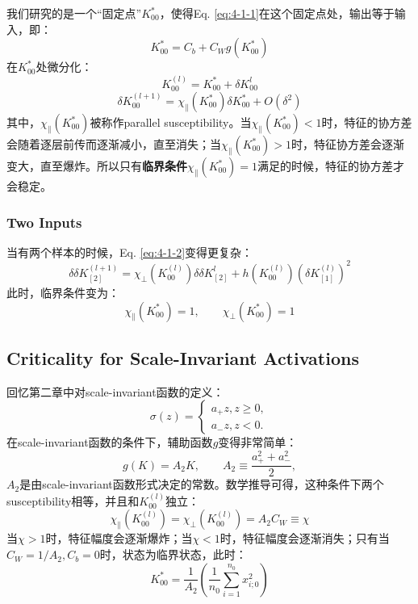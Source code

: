 我们研究的是一个``固定点''$K_{00}^{*}$，使得Eq. \ref{eq:4-1-1}在这个固定点处，输出等于输入，即：
\begin{equation}
    K_{00}^{*} = C_b + C_Wg(K_{00}^{*})
\end{equation}
在$K_{00}^{*}$处微分化：
\begin{equation}
    K_{00}^{(l)} = K_{00}^{*} + \delta K_{00}^{l}
\end{equation}
\begin{equation}
    \delta K_{00}^{(l+1)} = \chi_\parallel(K_{00}^{*})\delta K_{00}^{*} + O(\delta^2)
\label{eq:4-1-2}
\end{equation}
其中，$\chi_\parallel(K_{00}^{*})$被称作parallel susceptibility。当$\chi_\parallel(K_{00}^{*})<1$时，特征的协方差会随着逐层前传而逐渐减小，直至消失；当$\chi_\parallel(K_{00}^{*})>1$时，特征协方差会逐渐变大，直至爆炸。所以只有\textbf{临界条件}$\chi_\parallel(K_{00}^{*})=1$满足的时候，特征的协方差才会稳定。

\subsubsection{Two Inputs}
当有两个样本的时候，Eq. \ref{eq:4-1-2}变得更复杂：
\begin{equation}
    \delta \delta K_{[2]}^{(l+1)} = \chi_\perp(K_{00}^{(l)})\delta \delta K_{[2]}^{l} + h(K_{00}^{(l)})(\delta K_{[1]}^{(l)})^2
\label{eq:4-1-3}
\end{equation}
此时，临界条件变为：
\begin{equation}
    \chi_\parallel(K_{00}^{*})=1, \qquad \chi_\perp(K_{00}^{*})=1
\label{eq:4-1-4}
\end{equation}

\subsection{Criticality for Scale-Invariant Activations}
回忆第二章中对scale-invariant函数的定义：
\begin{equation}
    \sigma(z)=\left\{
        \begin{aligned}
            a_{+}z, z\geq 0,\\
            a_{-}z, z< 0.
        \end{aligned}
    \right.
\end{equation}
在scale-invariant函数的条件下，辅助函数$g$变得非常简单：
\begin{equation}
    g(K)=A_2 K, \qquad A_2\equiv \frac{a_{+}^2+a_{-}^2}{2},
\end{equation}
$A_2$是由scale-invariant函数形式决定的常数。数学推导可得，这种条件下两个susceptibility相等，并且和$K_{00}^{(l)}$独立：
\begin{equation}
    \chi_\parallel(K_{00}^{(l)})=\chi_\perp(K_{00}^{(l)})=A_2 C_W \equiv \chi
\end{equation}
当$\chi>1$时，特征幅度会逐渐爆炸；当$\chi<1$时，特征幅度会逐渐消失；只有当$C_W=1/A_2, C_b=0$时，状态为临界状态，此时：
\begin{equation}
    K_{00}^{*}=\frac{1}{A_2}(\frac{1}{n_0}\sum^{n_0}_{i=1}x_{i;0}^2)
\end{equation}

